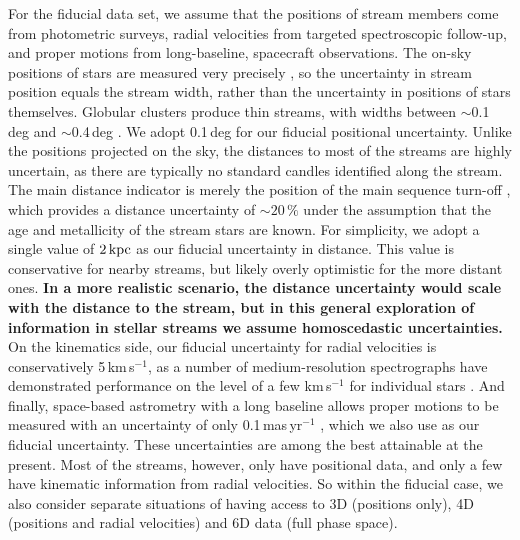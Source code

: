 \documentclass[modern]{aastex62}
\begin{document}
For the fiducial data set, we assume that the positions of stream members come from photometric surveys, radial velocities from targeted spectroscopic follow-up, and proper motions from long-baseline, spacecraft observations.
The on-sky positions of stars are measured very precisely \citep[for example, better than 100\,mas in SDSS,][]{pier2003}, so the uncertainty in stream position equals the stream width, rather than the uncertainty in positions of stars themselves.
Globular clusters produce thin streams, with widths between $\sim$0.1\,deg \citep[e.g., PS1A,][]{bernard2016} and $\sim$0.4\,deg \citep[e.g., Sangarius,][]{grillmair2017a}.
We adopt 0.1\,deg for our fiducial positional uncertainty.
Unlike the positions projected on the sky, the distances to most of the streams are highly uncertain, as there are typically no standard candles identified along the stream.
The main distance indicator is merely the position of the main sequence turn-off \citep[e.g.,][]{bonaca2012}, which provides a distance uncertainty of $\sim20\,\%$ under the assumption that the age and metallicity of the stream stars are known.
For simplicity, we adopt a single value of $2\,\rm kpc$ as our fiducial uncertainty in distance.
This value is conservative for nearby streams, but likely overly optimistic for the more distant ones.
{\bf In a more realistic scenario, the distance uncertainty would scale with the distance to the stream, but in this general exploration of information in stellar streams we assume homoscedastic uncertainties.}
On the kinematics side, our fiducial uncertainty for radial velocities is conservatively 5\,km\,s$^{-1}$, as a number of medium-resolution spectrographs have demonstrated performance on the level of a few km\,s$^{-1}$ for individual stars \citep[e.g.,][]{sg}.
And finally, space-based astrometry with a long baseline allows proper motions to be measured with an uncertainty of only 0.1\,mas\,yr$^{-1}$ \citep{sohn2015}, which we also use as our fiducial uncertainty.
These uncertainties are among the best attainable at the present.
Most of the streams, however, only have positional data, and only a few have kinematic information from radial velocities.
So within the fiducial case, we also consider separate situations of having access to 3D (positions only), 4D (positions and radial velocities) and 6D data (full phase space).
\end{document}
